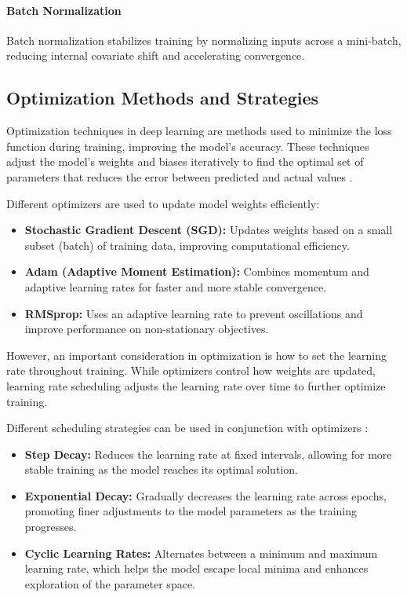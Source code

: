 \paragraph{Batch Normalization}
Batch normalization stabilizes training by normalizing inputs across a mini-batch, reducing internal covariate shift and accelerating convergence.



\subsection{Optimization Methods and Strategies}
Optimization techniques in deep learning are methods used to minimize the loss function during training, improving the model’s accuracy. These techniques adjust the model's weights and biases iteratively to find the optimal set of parameters that reduces the error between predicted and actual values \parencite{alzubaidi2021review}.

Different optimizers are used to update model weights efficiently:

\begin{itemize}
    \item \textbf{Stochastic Gradient Descent (SGD):} Updates weights based on a small subset (batch) of training data, improving computational efficiency.
    \item \textbf{Adam (Adaptive Moment Estimation):} Combines momentum and adaptive learning rates for faster and more stable convergence.
    \item \textbf{RMSprop:} Uses an adaptive learning rate to prevent oscillations and improve performance on non-stationary objectives.
\end{itemize}

However, an important consideration in optimization is how to set the learning rate throughout training. While optimizers control how weights are updated, learning rate scheduling adjusts the learning rate over time to further optimize training.

Different scheduling strategies can be used in conjunction with optimizers \parencite{zhao2019learningrate}:

\begin{itemize}
    \item \textbf{Step Decay:} Reduces the learning rate at fixed intervals, allowing for more stable training as the model reaches its optimal solution.
    \item \textbf{Exponential Decay:} Gradually decreases the learning rate across epochs, promoting finer adjustments to the model parameters as the training progresses.
    \item \textbf{Cyclic Learning Rates:} Alternates between a minimum and maximum learning rate, which helps the model escape local minima and enhances exploration of the parameter space.
\end{itemize}

